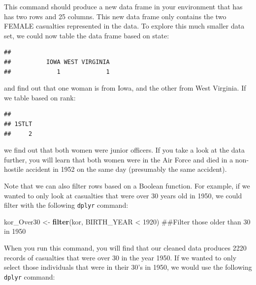 \documentclass[]{book}
\newenvironment{Shaded}{\begin{snugshade}}{\end{snugshade}}
\newcommand{\KeywordTok}[1]{\textcolor[rgb]{0.13,0.29,0.53}{\textbf{{#1}}}}
\newcommand{\DecValTok}[1]{\textcolor[rgb]{0.00,0.00,0.81}{{#1}}}
\newcommand{\StringTok}[1]{\textcolor[rgb]{0.31,0.60,0.02}{{#1}}}
\newcommand{\NormalTok}[1]{{#1}}
\begin{document}
This command should produce a new data frame in your environment that
has has two rows and 25 columns. This new data frame only contains the
two FEMALE casualties represented in the data. To explore this much
smaller data set, we could now table the data frame based on state:

\begin{Shaded}
\end{Shaded}

\begin{verbatim}
## 
##          IOWA WEST VIRGINIA 
##             1             1
\end{verbatim}

and find out that one woman is from Iowa, and the other from West
Virginia. If we table based on rank:

\begin{Shaded}
\end{Shaded}

\begin{verbatim}
## 
## 1STLT 
##     2
\end{verbatim}

we find out that both women were junior officers. If you take a look at
the data further, you will learn that both women were in the Air Force
and died in a non-hostile accident in 1952 on the same day (presumably
the same accident).

Note that we can also filter rows based on a Boolean function. For
example, if we wanted to only look at casualties that were over 30 years
old in 1950, we could filter with the following \texttt{dplyr} command:

\begin{Shaded}
\begin{Highlighting}[]
\NormalTok{kor_Over30 <-}\StringTok{ }\KeywordTok{filter}\NormalTok{(kor, BIRTH_YEAR <}\StringTok{ }\DecValTok{1920}\NormalTok{)  ##Filter those older than 30 in 1950}
\end{Highlighting}
\end{Shaded}

When you run this command, you will find that our cleaned data produces
2220 records of casualties that were over 30 in the year 1950. If we
wanted to only select those individuals that were in their 30's in 1950,
we would use the following \texttt{dplyr} command:
\end{document}
